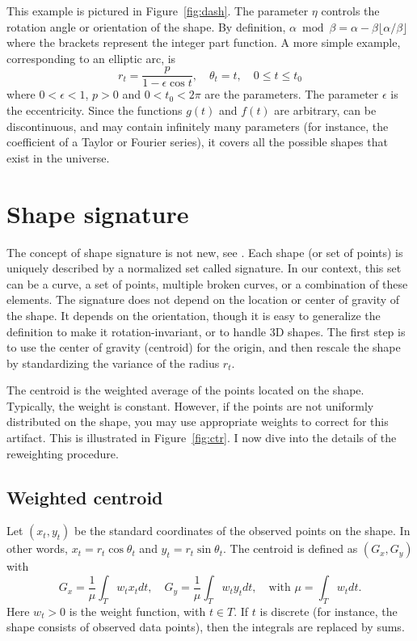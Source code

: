 \documentclass[oneside,10pt]{book}
\begin{document}
\noindent This example is pictured in Figure~\ref{fig:dash}. The parameter $\eta$ controls the rotation angle or orientation of the shape. By definition, $\alpha \bmod \beta =\alpha - \beta\lfloor \alpha/\beta\rfloor$ where the brackets represent the integer part function. A more simple example, corresponding to an elliptic arc, is
$$r_t=\frac{p}{1-\epsilon\cos t}, \quad \theta_t=t, \quad 0\leq t \leq t_0$$
where $0<\epsilon<1$, $p>0$ and $0<t_0<2\pi$ are the parameters. The parameter $\epsilon$ is the eccentricity. Since the functions $g(t)$ and $f(t)$ are arbitrary, can be discontinuous, and may contain infinitely many parameters (for instance, the coefficient of a Taylor or Fourier series), it covers all the possible shapes that exist in the universe.

\section{Shape signature}

The concept of shape signature is not new, see \cite{stama2007,fpark2001}. Each shape (or set of points) is uniquely described by a normalized set called \textcolor{index}{signature}. In our context, this set can be a curve, a set of points, multiple broken curves, or a combination of these elements. The signature does not depend on the location or center of gravity of the shape. It depends on the orientation, though it is easy to generalize the definition to make it rotation-invariant, or to handle 3D shapes. The first step is to use the center of gravity (centroid) for the origin, and then rescale the shape by standardizing the variance of the radius $r_t$.

The centroid is the weighted average of the points located on the shape. Typically, the weight is constant. However, if the points are not uniformly distributed on the shape, you may use appropriate weights to correct for this artifact. This is illustrated in Figure~\ref{fig:ctr}. I now dive into the details of the reweighting procedure.

\subsection{Weighted centroid}\label{centr1}

Let $(x_t, y_t)$ be the standard coordinates of the observed points on the shape. In other words, $x_t=r_t \cos\theta_t$ and $y_t=r_t\sin\theta_t$. The centroid is defined as $(G_x,G_y)$ with
\begin{equation}
G_x=\frac{1}{\mu}\int_T w_t x_t dt, \quad G_y= \frac{1}{\mu}\int_T w_t y_t dt, \quad \text{with } \mu=\int_T w_t dt. \label{eq1}
\end{equation}
Here $w_t>0$ is the weight function, with $t\in T$. If $t$ is discrete (for instance, the shape consists of observed data points), then the integrals are replaced by sums.
\end{document}
